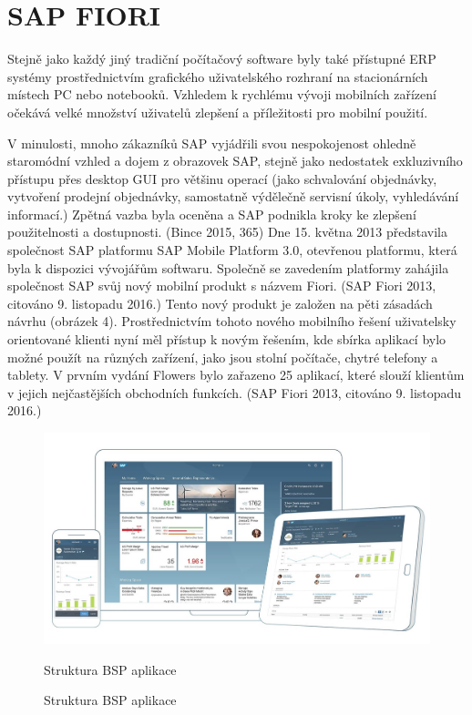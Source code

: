 \documentclass[thesis=M,czech]{FITthesis}[2012/06/26]
\begin{document}
\section{SAP FIORI}
\label{sec:fiori}

Stejně jako každý jiný tradiční počítačový software byly také přístupné ERP systémy prostřednictvím grafického uživatelského rozhraní na stacionárních místech PC nebo notebooků. Vzhledem k rychlému vývoji mobilních zařízení očekává velké množství uživatelů zlepšení a příležitosti pro mobilní použití.

V minulosti, mnoho zákazníků SAP vyjádřili svou nespokojenost ohledně staromódní vzhled a dojem z obrazovek SAP, stejně jako nedostatek exkluzivního přístupu přes desktop GUI pro většinu operací (jako schvalování objednávky, vytvoření prodejní objednávky, samostatně výdělečně servisní úkoly, vyhledávání informací.) Zpětná vazba byla oceněna a SAP podnikla kroky ke zlepšení použitelnosti a dostupnosti. (Bince 2015, 365)
Dne 15. května 2013 představila společnost SAP platformu SAP Mobile Platform 3.0, otevřenou platformu, která byla k dispozici vývojářům softwaru. Společně se zavedením platformy zahájila společnost SAP svůj nový mobilní produkt s názvem Fiori. (SAP Fiori 2013, citováno 9. listopadu 2016.) Tento nový produkt je založen na pěti zásadách návrhu (obrázek 4).
Prostřednictvím tohoto nového mobilního řešení uživatelsky orientované klienti nyní měl přístup k novým řešením, kde sbírka aplikací bylo možné použít na různých zařízení, jako jsou stolní počítače, chytré telefony a tablety. V prvním vydání Flowers bylo zařazeno 25 aplikací, které slouží klientům v jejich nejčastějších obchodních funkcích. (SAP Fiori 2013, citováno 9. listopadu 2016.)


\begin{figure}[H]
	\centering
	\includegraphics[width=1\textwidth]{images/fiori.jpg}
	\caption{Struktura BSP aplikace}
	\label{img:fiori}
	\small
	Struktura BSP aplikace
\end{figure}
\end{document}
